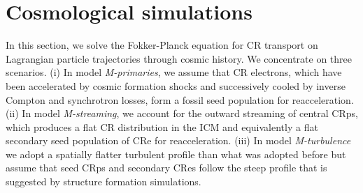\documentclass[fleqn,usenatbib,useAMS]{mnras}
\def\AP2#1{{\bf  AP2: #1}}
\def\AP#1{{\bf {\color{blue} AP: #1}}}
\def\SPO#1{{\bf {\color{red} SPO: #1}}}
\begin{document}


\section{Cosmological simulations}
\label{sec:results}

In this section, we solve the Fokker-Planck equation for CR transport
on Lagrangian particle trajectories through cosmic history.  We
concentrate on three scenarios. (i) In model {\em M-primaries}, we
assume that CR electrons, which have been accelerated by cosmic
formation shocks and successively cooled by inverse Compton and
synchrotron losses, form a fossil seed population for
reacceleration. (ii) In model {\em M-streaming}, we account for the
outward streaming of central CRps, which produces a flat CR
distribution in the ICM and equivalently a flat secondary seed
population of CRe for reacceleration. (iii) In model {\em
  M-turbulence} we adopt a spatially flatter turbulent profile than
what was adopted before but assume that seed CRps and secondary CRes
follow the steep profile that is suggested by structure formation
simulations.
\end{document}
